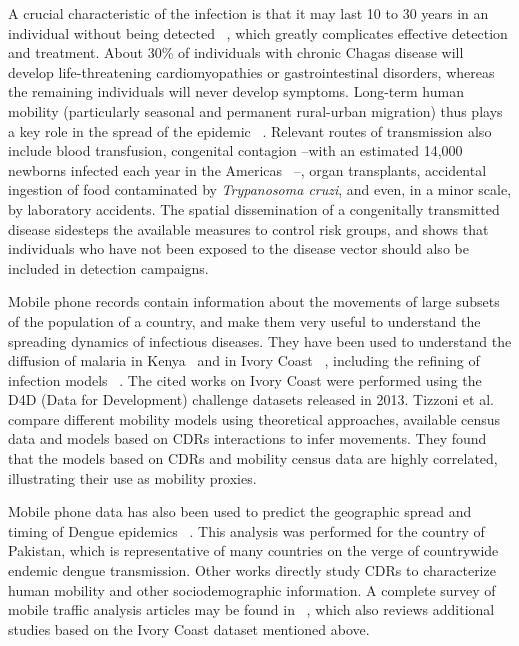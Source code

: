 A crucial characteristic of the infection is that it may last 10 to 30 years in an individual without being detected~ \textcite{rassi2012american}, which greatly complicates effective detection and treatment. About 30\% of individuals with chronic Chagas disease will develop life-threatening cardiomyopathies or gastrointestinal disorders, whereas 
the remaining individuals will never develop symptoms.
Long-term human mobility (particularly seasonal and permanent rural-urban migration) thus plays a key role in the spread of the epidemic~ \textcite{briceno2009chagas}. Relevant routes of transmission also include blood transfusion, congenital contagion --with an estimated 14,000 newborns infected each year in the Americas~ \textcite{OPS2006chagas}--,
organ transplants, 
accidental ingestion of food contaminated by \textit{Trypanosoma cruzi}, and even, in a minor scale, 
by laboratory accidents.
The spatial dissemination of a congenitally transmitted disease sidesteps the available measures to control risk groups, and shows that individuals who have not been exposed to the disease vector should also be included in detection campaigns.

Mobile phone records contain information about the movements of large subsets of the population of a country, and make them very useful to understand the spreading dynamics of infectious diseases. They have been used to understand the diffusion of malaria in Kenya~ \textcite{wesolowski2012quantifying} and in Ivory Coast~ \textcite{enns2013human}, including the refining of infection models~ \textcite{chunara2013large}. The cited works on Ivory Coast were performed using the D4D (Data for Development) challenge datasets released in 2013. Tizzoni et al.~ \textcite{tizzoni2014use} compare different mobility models using theoretical approaches, available census data and models based on CDRs interactions to infer movements. They found that the models based on CDRs and mobility census data are highly correlated, illustrating their use as mobility proxies.

Mobile phone data has also been used to predict the geographic spread and timing of Dengue epidemics~ \textcite{wesolowski2015impact}. This analysis was performed for the country of Pakistan, which is representative of many countries on the verge of countrywide endemic dengue transmission. Other works directly study CDRs to characterize human mobility and other sociodemographic information. A complete survey of mobile traffic analysis articles may be found in~ \textcite{naboulsi2015mobile}, which also reviews additional studies based on the Ivory Coast dataset mentioned above.

